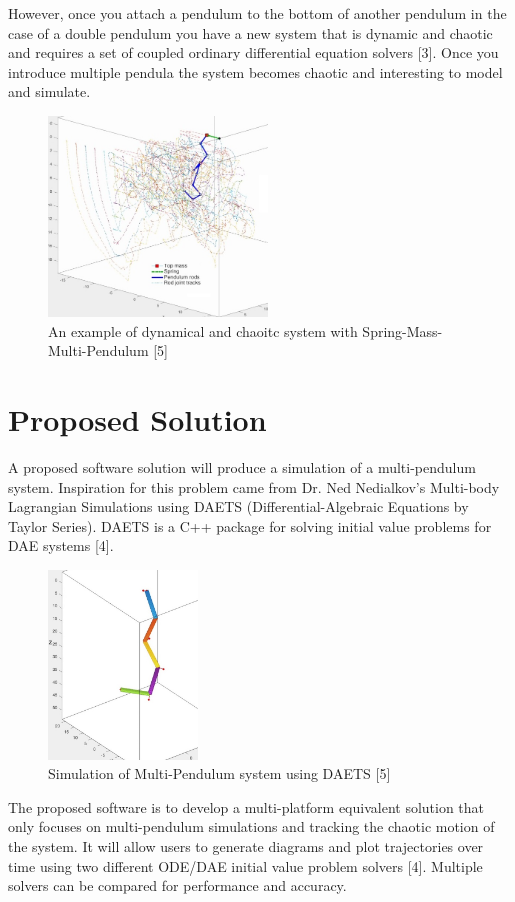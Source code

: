 \documentclass{article}
\begin{document}
However, once you attach a pendulum to the bottom of another pendulum in the
case of a double pendulum you have a new system that is dynamic and chaotic and
requires a set of coupled ordinary differential equation solvers [3]. Once you
introduce multiple pendula the system becomes chaotic and interesting to model
and simulate.

\begin{figure}[h]
	\centering
	\includegraphics[width=220px]{multi-pend.jpg}
\caption{An example of dynamical and chaoitc system with
Spring-Mass-Multi-Pendulum [5]}
	\label{fig:multipend}
\end{figure}

\section*{Proposed Solution}
A proposed software solution will produce a simulation of a multi-pendulum
system. Inspiration for this problem came from Dr. Ned Nedialkov's Multi-body
Lagrangian Simulations using DAETS (Differential-Algebraic Equations by Taylor
Series). DAETS is a C++ package for solving initial value problems for DAE
systems [4].

\begin{figure}[h]
	\centering
	\includegraphics[width=150px]{3pend.jpg}
	\caption{Simulation of Multi-Pendulum system using DAETS [5]}
	\label{fig:simpendula}
\end{figure}

The proposed software is to develop a multi-platform equivalent solution that
only focuses on multi-pendulum simulations and tracking the chaotic motion of
the system. It will allow users to generate diagrams and plot trajectories over
time using two different ODE/DAE initial value problem solvers [4]. 
Multiple solvers can be compared for performance and accuracy.
\end{document}
